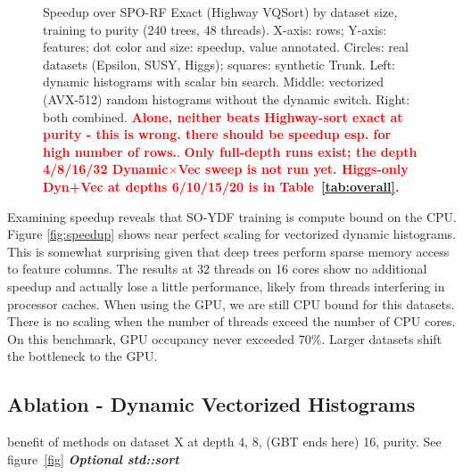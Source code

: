 \documentclass[sigconf,anonymous,review]{acmart}
\newcommand{\TODO}[1]{\textbf{\textcolor{red}{#1}}}
\begin{document}
\begin{figure}[t]
    \centering
    \caption{Speedup over SPO-RF Exact (Highway VQSort) by dataset size, training to purity (240 trees, 48 threads). X-axis: rows; Y-axis: features; dot color and size: speedup, value annotated. Circles: real datasets (Epsilon, SUSY, Higgs); squares: synthetic Trunk. Left: dynamic histograms with scalar bin search. Middle: vectorized (AVX-512) random histograms without the dynamic switch. Right: both combined. \TODO{Alone, neither beats Highway-sort exact at purity - this is wrong. there should be speedup esp. for high number of rows.}. \TODO{Only full-depth runs exist; the depth 4/8/16/32 Dynamic$\times$Vec sweep is not run yet. Higgs-only Dyn+Vec at depths 6/10/15/20 is in Table~\ref{tab:overall}.}}
    \label{fig:dyn-vs-size}
\end{figure}

Examining speedup reveals that SO-YDF training is compute bound on the CPU. Figure \ref{fig:speedup} shows near perfect scaling for vectorized dynamic histograms. This is somewhat surprising given that deep trees perform sparse memory access to feature columns. The results at 32 threads on 16 cores show no additional speedup and actually lose a little performance, likely from threads interfering in processor caches. When using the GPU, we are still CPU bound for this datasets. There is no scaling when the number of threads exceed the number of CPU cores. On this benchmark, GPU occupancy never exceeded 70\%. Larger datasets shift the bottleneck to the GPU.

\subsection{Ablation - Dynamic Vectorized Histograms}
\label{sec:dyn}

benefit of methods on dataset X at depth 4, 8, (GBT ends here) 16, purity. See figure~\ref{fig} \textbf{\textit{Optional std::sort}}
\end{document}
